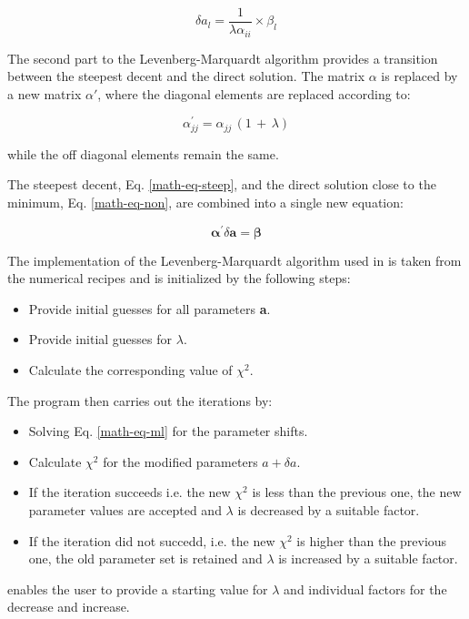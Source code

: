 \begin{equation}
  \delta a_{l} = \frac{1}{\lambda \alpha_{ii}} \times {\beta}_{l}
  \label{math-eq-steeplm}
\end{equation}

The second part to the Levenberg-Marquardt algorithm provides a transition
between the steepest decent and the direct solution. The matrix 
{\bf $\alpha$} is replaced by a new matrix {\bf $\alpha '$}, where the 
diagonal elements are replaced according to:

\begin{equation}
  \alpha_{jj}^{\prime} = \alpha_{jj} \, \left ( 1 \, + \, \lambda \right )
  \label{math-eq-alphap}
\end{equation}

while the off diagonal elements remain the same.

The steepest decent, Eq. \ref{math-eq-steep}, and the direct solution close 
to the minimum, Eq. \ref{math-eq-non}, are combined into a single new equation:

\begin{equation}
  \bm{\alpha}^{\prime} \delta \bm{a} = \bm{\beta}
  \label{math-eq-ml}
\end{equation}

The implementation of the Levenberg-Marquardt algorithm used in \Refine is taken 
from the numerical recipes \cite{prflteve1989} and is initialized by the following 
steps:
\begin{itemize}
  \item Provide initial guesses for all parameters {\bf a}.
  \item Provide initial guesses for $\lambda$.
  \item Calculate the corresponding value of $\chi^2$.
\end{itemize}

The program then carries out the iterations by:

\begin{itemize}
  \item Solving Eq. \ref{math-eq-ml} for the parameter shifts.
  \item Calculate $\chi^2$ for the modified parameters $a + \delta a$.
  \item If the iteration succeeds i.e. the new $\chi^2$ is less than
        the previous one, the new parameter values are accepted and
        $\lambda$ is decreased by a suitable factor.
  \item If the iteration did not succedd, i.e. the new $\chi^2$ is 
        higher than the previous one, the old parameter set is retained
        and $\lambda$ is increased by a suitable factor.
\end{itemize}

\Refine enables the user to provide a starting value for $\lambda$ and
individual factors for the decrease and increase. 
